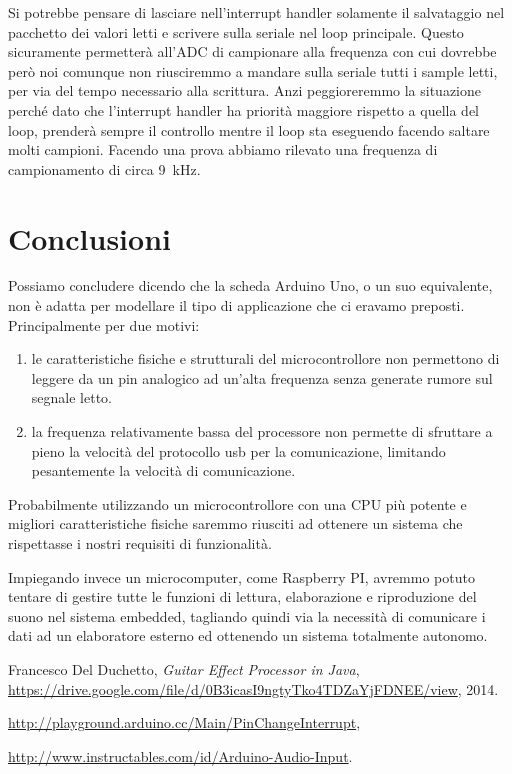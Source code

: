 \documentclass[a4paper,11pt]{article}
\begin{document}
\vspace{0.2in}
Si potrebbe pensare di lasciare nell'interrupt handler solamente il salvataggio nel pacchetto dei valori letti e scrivere sulla seriale nel loop principale. Questo sicuramente permetterà all'ADC di campionare alla frequenza con cui dovrebbe però noi comunque non riusciremmo a mandare sulla seriale tutti i sample letti, per via del tempo necessario alla scrittura. Anzi peggioreremmo la situazione perché dato che l'interrupt handler ha priorità maggiore rispetto a quella del loop, prenderà sempre il controllo mentre il loop sta eseguendo facendo saltare molti campioni. Facendo una prova abbiamo rilevato una frequenza di campionamento di circa \SI{9}{\kilo\hertz}.

\section{Conclusioni}
Possiamo concludere dicendo che la scheda Arduino Uno, o un suo equivalente, non è adatta per modellare il tipo di applicazione che ci eravamo preposti. Principalmente per due motivi:
\begin{enumerate}
	\item le caratteristiche fisiche e strutturali del microcontrollore non permettono di leggere da un pin analogico ad un'alta frequenza senza generate rumore sul segnale letto.
	\item la frequenza relativamente bassa del processore non permette di sfruttare a pieno la velocità del protocollo usb per la comunicazione, limitando pesantemente la velocità di comunicazione.
\end{enumerate}

Probabilmente utilizzando un microcontrollore con una CPU più potente e migliori caratteristiche fisiche saremmo riusciti ad ottenere un sistema che rispettasse i nostri requisiti di funzionalità. 

Impiegando invece un microcomputer, come Raspberry PI, avremmo potuto tentare di gestire tutte le funzioni di lettura, elaborazione e riproduzione del suono nel sistema embedded, tagliando quindi via la necessità di comunicare i dati ad un elaboratore esterno ed ottenendo un sistema totalmente autonomo.
\begin{thebibliography}{9}

  Francesco Del Duchetto,
  \emph{Guitar Effect Processor in Java},
  \url{https://drive.google.com/file/d/0B3icasI9ngtyTko4TDZaYjFDNEE/view},
  2014.

	\url{http://playground.arduino.cc/Main/PinChangeInterrupt},
	
	\url{http://www.instructables.com/id/Arduino-Audio-Input}.

\end{thebibliography}
\end{document}
